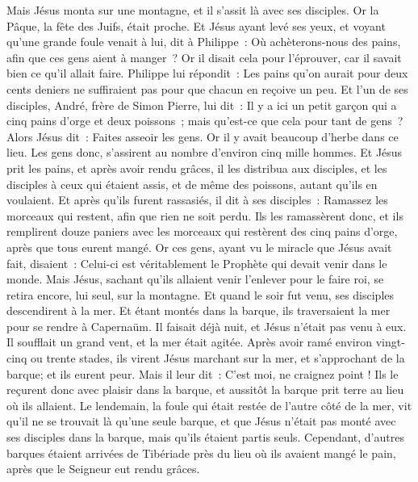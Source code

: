 \begin{multicols}{2}
Mais Jésus monta sur une montagne, et il s'assit là avec ses disciples.
Or la Pâque, la fête des Juifs, était proche.
Et Jésus ayant levé ses yeux, et voyant qu'une grande foule venait à lui, dit à Philippe~: Où achèterons-nous des pains, afin que ces gens aient à manger~?
Or il disait cela pour l'éprouver, car il savait bien ce qu'il allait faire.
Philippe lui répondit~: Les pains qu'on aurait pour deux cents deniers ne suffiraient pas pour que chacun en reçoive un peu.
Et l'un de ses disciples, André, frère de Simon Pierre, lui dit~:
Il y a ici un petit garçon qui a cinq pains d'orge et deux poissons~; mais qu'est-ce que cela pour tant de gens~?
Alors Jésus dit~: Faites asseoir les gens. Or il y avait beaucoup d'herbe dans ce lieu. Les gens donc, s'assirent au nombre d'environ cinq mille hommes.
Et Jésus prit les pains, et après avoir rendu grâces, il les distribua aux disciples, et les disciples à ceux qui étaient assis, et de même des poissons, autant qu'ils en voulaient.
Et après qu'ils furent rassasiés, il dit à ses disciples~: Ramassez les morceaux qui restent, afin que rien ne soit perdu.
Ils les ramassèrent donc, et ils remplirent douze paniers avec les morceaux qui restèrent des cinq pains d'orge, après que tous eurent mangé.
Or ces gens, ayant vu le miracle que Jésus avait fait, disaient~: Celui-ci est véritablement le Prophète qui devait venir dans le monde.
Mais Jésus, sachant qu'ils allaient venir l'enlever pour le faire roi, se retira encore, lui seul, sur la montagne.
Et quand le soir fut venu, ses disciples descendirent à la mer.
Et étant montés dans la barque, ils traversaient la mer pour se rendre à Capernaüm. Il faisait déjà nuit, et Jésus n'était pas venu à eux.
Il soufflait un grand vent, et la mer était agitée.
Après avoir ramé environ vingt-cinq ou trente stades, ils virent Jésus marchant sur la mer, et s'approchant de la barque; et ils eurent peur.
Mais il leur dit~: C'est moi, ne craignez point !
Ils le reçurent donc avec plaisir dans la barque, et aussitôt la barque prit terre au lieu où ils allaient.
Le lendemain, la foule qui était restée de l'autre côté de la mer, vit qu'il ne se trouvait là qu'une seule barque, et que Jésus n'était pas monté avec ses disciples dans la barque, mais qu'ils étaient partis seuls.
Cependant, d'autres barques étaient arrivées de Tibériade près du lieu où ils avaient mangé le pain, après que le Seigneur eut rendu grâces.

\end{multicols}
